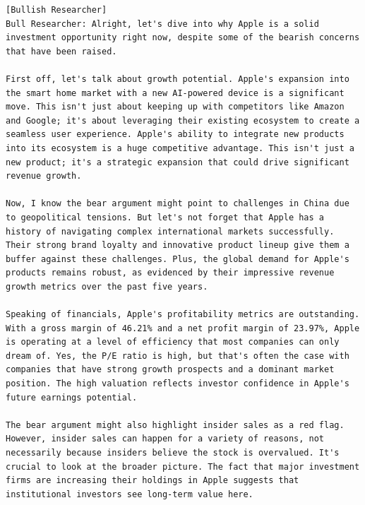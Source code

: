 \begin{tcolorbox}[
    breakable,
    enhanced,
    colback=lightyellow!60!white,
    colframe=orange!20!gray,
    coltitle=black,
    boxrule=0.5pt,
    arc=0.5mm,
    top=2mm, bottom=2mm, left=2mm, right=2mm,
    fonttitle=\usefont{T1}{ppl}{b}{n},
    title=\model: Researcher Team Bullish Opinion -- Apple (AAPL),
]
\footnotesize
\begin{lstlisting}[style=agentbase]
[Bullish Researcher]
Bull Researcher: Alright, let's dive into why Apple is a solid investment opportunity right now, despite some of the bearish concerns that have been raised.

First off, let's talk about growth potential. Apple's expansion into the smart home market with a new AI-powered device is a significant move. This isn't just about keeping up with competitors like Amazon and Google; it's about leveraging their existing ecosystem to create a seamless user experience. Apple's ability to integrate new products into its ecosystem is a huge competitive advantage. This isn't just a new product; it's a strategic expansion that could drive significant revenue growth.

Now, I know the bear argument might point to challenges in China due to geopolitical tensions. But let's not forget that Apple has a history of navigating complex international markets successfully. Their strong brand loyalty and innovative product lineup give them a buffer against these challenges. Plus, the global demand for Apple's products remains robust, as evidenced by their impressive revenue growth metrics over the past five years.

Speaking of financials, Apple's profitability metrics are outstanding. With a gross margin of 46.21% and a net profit margin of 23.97%, Apple is operating at a level of efficiency that most companies can only dream of. Yes, the P/E ratio is high, but that's often the case with companies that have strong growth prospects and a dominant market position. The high valuation reflects investor confidence in Apple's future earnings potential.

The bear argument might also highlight insider sales as a red flag. However, insider sales can happen for a variety of reasons, not necessarily because insiders believe the stock is overvalued. It's crucial to look at the broader picture. The fact that major investment firms are increasing their holdings in Apple suggests that institutional investors see long-term value here.


\end{lstlisting}
\end{tcolorbox}
